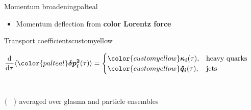 \documentclass[aspectratio=169,11pt,usenames,dvipsnames]{beamer}
\renewcommand{\d}{\mathrm{d}}
\begin{document}
\begin{frame}
\begin{columns}[onlytextwidth,t]
\begin{center}
\begin{custombox2}{Momentum broadening}{palteal}
\begin{varwidth}{0.92\textwidth}
                    \vspace{-5pt}
                    \begin{itemize}\itemsep0em 
                        \item {\scriptsize Momentum deflection from {\color{palteal}\bfseries color Lorentz force}}
                        \vspace{3pt}
                    \end{itemize}
                    \end{varwidth}
                \end{custombox2}

                \begin{custombox2}{Transport coefficients}{customyellow}
                    \small
                    \begin{varwidth}{0.92\textwidth}
                        \vspace{-12pt}
                    $$\frac{\d }{\d\tau}\langle {\color{palteal}\boldsymbol{\delta p^2_i}}(\tau)\rangle= \begin{cases}{\color{customyellow}\boldsymbol{\kappa_i}}(\tau),&\text{heavy quarks}\\
                        {\color{customyellow}\boldsymbol{\hat{q}_i}}(\tau),&\text{jets}\end{cases}$$
                    \\[-30pt]
                    {\begin{center}\scriptsize\color{lightgray} $\langle \quad\rangle$ averaged over glasma and particle ensembles\end{center}}    
                    \end{varwidth}
                \end{custombox2}


\end{center}
\end{columns}
\end{frame}
\end{document}
